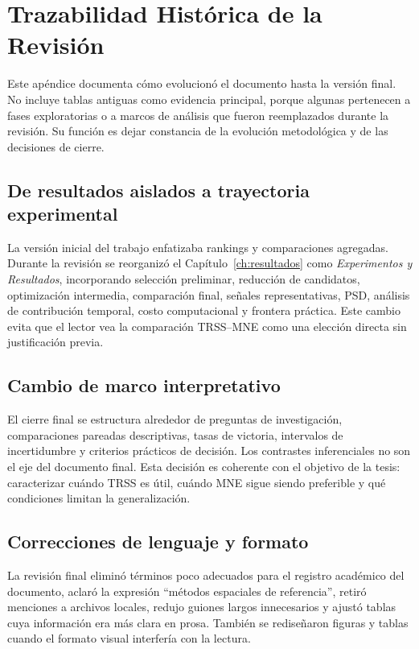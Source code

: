 \chapter{Trazabilidad Histórica de la Revisión}
\label{ap:original_adaptado}

Este apéndice documenta cómo evolucionó el documento hasta la versión final. No incluye tablas antiguas como evidencia principal, porque algunas pertenecen a fases exploratorias o a marcos de análisis que fueron reemplazados durante la revisión. Su función es dejar constancia de la evolución metodológica y de las decisiones de cierre.

\section{De resultados aislados a trayectoria experimental}

La versión inicial del trabajo enfatizaba rankings y comparaciones agregadas. Durante la revisión se reorganizó el Capítulo~\ref{ch:resultados} como \textit{Experimentos y Resultados}, incorporando selección preliminar, reducción de candidatos, optimización intermedia, comparación final, señales representativas, PSD, análisis de contribución temporal, costo computacional y frontera práctica. Este cambio evita que el lector vea la comparación TRSS--MNE como una elección directa sin justificación previa.

\section{Cambio de marco interpretativo}

El cierre final se estructura alrededor de preguntas de investigación, comparaciones pareadas descriptivas, tasas de victoria, intervalos de incertidumbre y criterios prácticos de decisión. Los contrastes inferenciales no son el eje del documento final. Esta decisión es coherente con el objetivo de la tesis: caracterizar cuándo TRSS es útil, cuándo MNE sigue siendo preferible y qué condiciones limitan la generalización.

\section{Correcciones de lenguaje y formato}

La revisión final eliminó términos poco adecuados para el registro académico del documento, aclaró la expresión “métodos espaciales de referencia”, retiró menciones a archivos locales, redujo guiones largos innecesarios y ajustó tablas cuya información era más clara en prosa. También se rediseñaron figuras y tablas cuando el formato visual interfería con la lectura.

